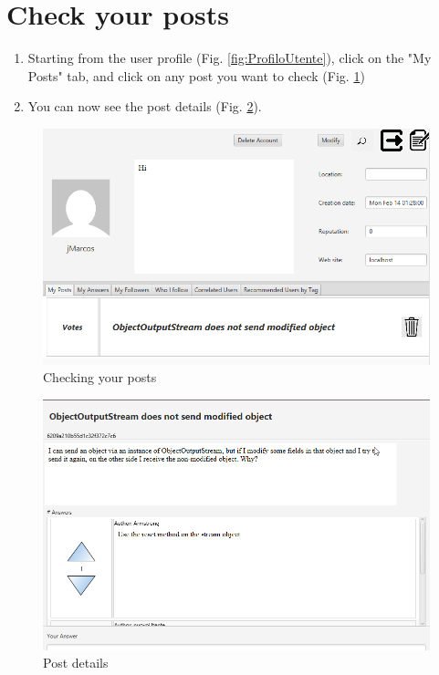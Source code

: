\documentclass[11pt]{report}
\begin{document}
\section{Check your posts}
\begin{enumerate}
    \item Starting from the user profile (Fig. \ref{fig:ProfiloUtente}), click on the "My Posts" tab, and click on any post you want to check (Fig. \ref{fig:ControlloPost1})
    \item You can now see the post details (Fig. \ref{fig:ControlloPost2}).
\end{enumerate}
\begin{figure}[H]
  \centering
  \includegraphics[width=\textwidth,keepaspectratio=true]{img/user_manual/ControlloPost1.png}
  \caption{Checking your posts}
  \label{fig:ControlloPost1}
\end{figure}
\begin{figure}[H]
  \centering
  \includegraphics[width=\textwidth,keepaspectratio=true]{img/user_manual/ControlloPost2.png}
  \caption{Post details}
  \label{fig:ControlloPost2}
\end{figure}
\end{document}
